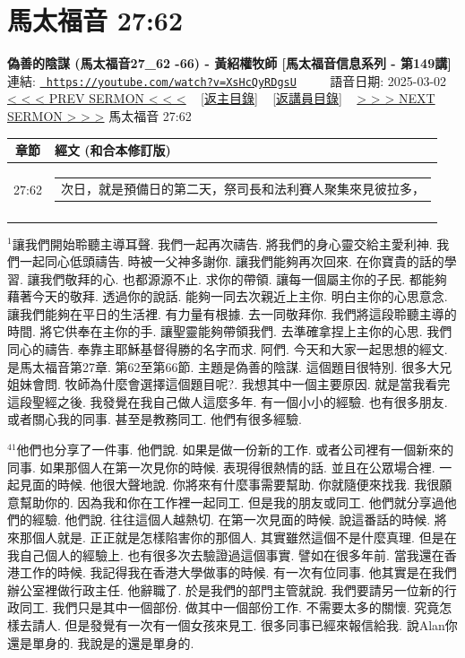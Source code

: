 \documentclass{book}
\begin{document}
\section{馬太福音 27:62}
\label{sec:XsHcQyRDgsU}
\textbf{偽善的陰謀 (馬太福音27\_62 -66) - 黃紹權牧師  [馬太福音信息系列 - 第149講]}
\newline
\newline
連結: \href{https://youtube.com/watch?v=XsHcQyRDgsU}{\texttt{ https://youtube.com/watch?v=XsHcQyRDgsU}} ~~~~ 語音日期: 2025-03-02 
\newline
\newline
\hyperref[sec:MfR5_HAo14I]{< < < PREV SERMON < < <}
~
\hyperlink{toc}{[返主目錄]}
~
\hyperref[ch:preacher15]{[返講員目錄]}
~
\hyperref[sec:FPn17JgDaFk]{> > > NEXT SERMON > > >}
\newline
\newline
馬太福音 27:62
\newline
\begin{longtable}{cl}
\hline
\hline
章節 & 經文 (和合本修訂版)\\
\hline
27:62 & \begin{tabularx}{0.7\textwidth}{X} 次日，就是預備日的第二天，祭司長和法利賽人聚集來見彼拉多， \end{tabularx} \\ \\
[1ex]
\hline
\hline
\end{longtable}
$^{1}$讓我們開始聆聽主導耳聲.
我們一起再次禱告.
將我們的身心靈交給主愛利神.
我們一起同心低頭禱告.
時被一父神多謝你.
讓我們能夠再次回來.
在你寶貴的話的學習.
讓我們敬拜的心.
也都源源不止.
求你的帶領.
讓每一個屬主你的子民.
都能夠藉著今天的敬拜.
透過你的說話.
能夠一同去次親近上主你.
明白主你的心思意念.
讓我們能夠在平日的生活裡.
有力量有根據.
去一同敬拜你.
我們將這段聆聽主導的時間.
將它供奉在主你的手.
讓聖靈能夠帶領我們.
去準確拿捏上主你的心思.
我們同心的禱告.
奉靠主耶穌基督得勝的名字而求.
阿們.
今天和大家一起思想的經文.
是馬太福音第27章.
第62至第66節.
主題是偽善的陰謀.
這個題目很特別.
很多大兄姐妹會問.
牧師為什麼會選擇這個題目呢?.
我想其中一個主要原因.
就是當我看完這段聖經之後.
我發覺在我自己做人這麼多年.
有一個小小的經驗.
也有很多朋友.
或者關心我的同事.
甚至是教務同工.
他們有很多經驗.

$^{41}$他們也分享了一件事.
他們說.
如果是做一份新的工作.
或者公司裡有一個新來的同事.
如果那個人在第一次見你的時候.
表現得很熱情的話.
並且在公眾場合裡.
一起見面的時候.
他很大聲地說.
你將來有什麼事需要幫助.
你就隨便來找我.
我很願意幫助你的.
因為我和你在工作裡一起同工.
但是我的朋友或同工.
他們就分享過他們的經驗.
他們說.
往往這個人越熱切.
在第一次見面的時候.
說這番話的時候.
將來那個人就是.
正正就是怎樣陷害你的那個人.
其實雖然這個不是什麼真理.
但是在我自己個人的經驗上.
也有很多次去驗證過這個事實.
譬如在很多年前.
當我還在香港工作的時候.
我記得我在香港大學做事的時候.
有一次有位同事.
他其實是在我們辦公室裡做行政主任.
他辭職了.
於是我們的部門主管就說.
我們要請另一位新的行政同工.
我們只是其中一個部份.
做其中一個部份工作.
不需要太多的關懷.
究竟怎樣去請人.
但是發覺有一次有一個女孩來見工.
很多同事已經來報信給我.
說Alan你還是單身的.
我說是的還是單身的.
\end{document}
